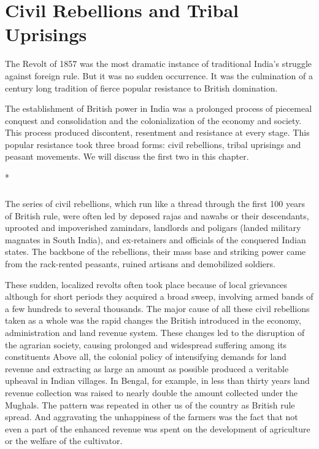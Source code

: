 \chapter{Civil Rebellions and Tribal Uprisings}
\begin{multicols}{2}

The Revolt of 1857 was the most dramatic instance of traditional India's struggle against foreign rule. But it was no sudden occurrence. It was the culmination of a century long tradition of fierce popular resistance to British domination.

The establishment of British power in India was a prolonged process of piecemeal conquest and consolidation and the colonialization of the economy and society. This process produced discontent, resentment and resistance at every stage. This popular resistance took three broad forms: civil rebellions, tribal uprisings and peasant movements. We will discuss the first two in this chapter.

\begin{center}*\end{center}

\paragraph*{}
The series of civil rebellions, which run like a thread through the first 100 years of British rule, were often led by deposed rajas and nawabs or their descendants, uprooted and impoverished zamindars, landlords and poligars (landed military magnates in South India), and ex-retainers and officials of the conquered Indian states. The backbone of the rebellions, their mass base and striking power came from the rack-rented peasants, ruined artisans and demobilized soldiers.

These sudden, localized revolts often took place because of local grievances although for short periods they acquired a broad sweep, involving armed bands of a few hundreds to several thousands. The major cause of all these civil rebellions taken as a whole was the rapid changes the British introduced in the economy, administration and land revenue system. These changes led to the disruption of the agrarian society, causing prolonged and widespread suffering among its constituents Above all, the colonial policy of intensifying demands for land revenue and extracting as large an amount as possible produced a veritable upheaval in Indian villages. In Bengal, for example, in less than thirty years land revenue collection was raised to nearly double the amount collected under the Mughals. The pattern was repeated in other us of the country as British rule spread. And aggravating the unhappiness of the farmers was the fact that not even a part of the enhanced revenue was spent on the development of agriculture or the welfare of the cultivator.


\end{multicols}
